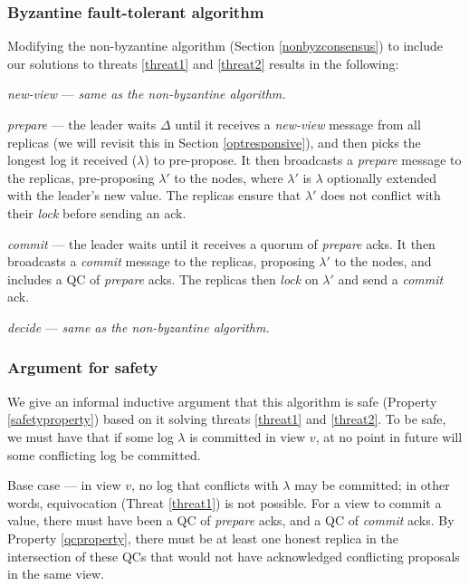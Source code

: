 \subsubsection{Byzantine fault-tolerant algorithm}
Modifying the non-byzantine algorithm (Section \ref{nonbyzconsensus}) to include our solutions to threats \ref{threat1} and \ref{threat2} results in the following:

\begin{description}
	\item \textit{new-view} --- \textit{same as the non-byzantine algorithm.}
	\item \textit{prepare} --- the leader waits $\Delta$ until it receives a \textit{new-view} message from all replicas (we will revisit this in Section \ref{optresponsive}), and then picks the longest log it received ($\lambda$) to pre-propose. It then broadcasts a \textit{prepare} message to the replicas, pre-proposing $\lambda'$ to the nodes, where $\lambda'$ is $\lambda$ optionally extended with the leader's new value. The replicas ensure that $\lambda'$ does not conflict with their \textit{lock} before sending an ack.
	\item \textit{commit} --- the leader waits until it receives a quorum of \textit{prepare} acks. It then broadcasts a \textit{commit} message to the replicas, proposing $\lambda'$ to the nodes, and includes a QC of \textit{prepare} acks. The replicas then \textit{lock} on $\lambda'$ and send a \textit{commit} ack.
	\item \textit{decide} --- \textit{same as the non-byzantine algorithm.}
\end{description}

\subsubsection{Argument for safety} \label{safetyargument}
We give an informal inductive argument that this algorithm is safe (Property \ref{safetyproperty}) based on it solving threats \ref{threat1} and \ref{threat2}. To be safe, we must have that if some log $\lambda$ is committed in view $v$, at no point in future will some conflicting log be committed.

Base case --- in view $v$, no log that conflicts with $\lambda$ may be committed; in other words, equivocation (Threat \ref{threat1}) is not possible. For a view to commit a value, there must have been a QC of \textit{prepare} acks, and a QC of \textit{commit} acks. By Property \ref{qcproperty}, there must be at least one honest replica in the intersection of these QCs that would not have acknowledged conflicting proposals in the same view.

